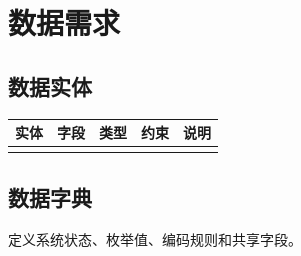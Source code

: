 \section{数据需求}

\subsection{数据实体}

\begin{longtable}{|p{26mm}|p{30mm}|p{22mm}|p{30mm}|p{36mm}|}
\hline
\textbf{实体} & \textbf{字段} & \textbf{类型} & \textbf{约束} & \textbf{说明} \\
\hline
 &  &  &  &  \\
\hline
\end{longtable}

\subsection{数据字典}

定义系统状态、枚举值、编码规则和共享字段。
